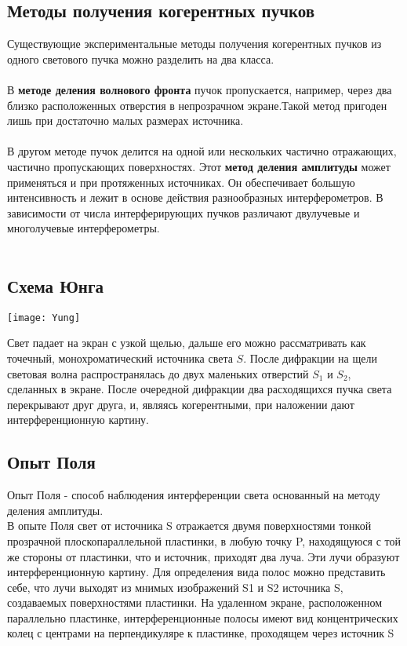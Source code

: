 \subsection{Методы получения когерентных пучков}

Существующие экспериментальные методы получения когерентных пучков из одного светового пучка можно разделить на два класса.
\\ \\
В \textbf{методе деления волнового фронта} пучок пропускается, например, через два близко расположенных отверстия в непрозрачном экране.Такой метод пригоден лишь при достаточно малых размерах источника.
\\ \\
 В другом методе пучок делится на одной или нескольких частично отражающих, частично пропускающих поверхностях. Этот \textbf{метод деления амплитуды} может применяться и при протяженных источниках. Он обеспечивает большую интенсивность и лежит в основе действия разнообразных интерферометров. В зависимости от числа интерферирующих пучков различают двулучевые и многолучевые интерферометры. \\ \\ 
 
 \subsection{Схема Юнга}

\begin{center}
\texttt{[image: Yung]}
\end{center}

Свет падает на экран с узкой щелью, дальше его можно рассматривать как точечный, монохроматический источника света $S$. После дифракции на щели световая волна распространялась до двух маленьких отверстий $S_1$ и $S_2$, сделанных в экране. После очередной дифракции два расходящихся пучка света перекрывают друг друга, и, являясь когерентными, при наложении дают интерференционную картину.

\subsection{Опыт Поля}

Опыт Поля - способ наблюдения интерференции света основанный на методу деления амплитуды.\\

В опыте Поля свет от источника S отражается двумя поверхностями тонкой прозрачной плоскопараллельной пластинки, в любую точку P, находящуюся с той же стороны от пластинки, что и источник, приходят два луча. Эти лучи образуют интерференционную картину. Для определения вида полос можно представить себе, что лучи выходят из мнимых изображений S1 и S2 источника S, создаваемых поверхностями пластинки. На удаленном экране, расположенном параллельно пластинке, интерференционные полосы имеют вид концентрических колец с центрами на перпендикуляре к пластинке, проходящем через источник S

